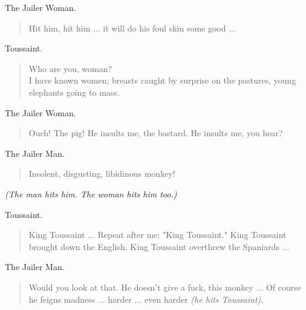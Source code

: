 \documentclass[letterpaper,article,12pt,oneside,notitlepage]{memoir}
\begin{document}
\begin{center}The Jailer Woman.\end{center}

\begin{verse}
Hit him, hit him ... it will do his foul skin some good ... \\
\end{verse}

\begin{center}Toussaint.\end{center}

\begin{verse}
Who are you, woman? \\
I have known women; breasts caught by surprise on the pastures, young elephants going to mass. \\
\end{verse}

\begin{center}The Jailer Woman.\end{center}

\begin{verse}
Ouch! The pig! He insults me, the bastard. He insults me, you hear? \\
\end{verse}

\begin{center}The Jailer Man.\end{center}

\begin{verse}
Insolent, disgusting, libidinous monkey! \\
\end{verse}

\textit{(The man hits him. The woman hits him too.)}

\begin{center}Toussaint.\end{center}

\begin{verse}
\indent King Toussaint ... Repeat after me: "King Toussaint." King Toussaint brought down the English. King Toussaint overthrew the Spaniards ...  \\
\end{verse}

\begin{center}The Jailer Man.\end{center}

\begin{verse}
\indent Would you look at that. He doesn't give a fuck, this monkey ... Of course he feigns madness ... harder ... even harder \textit{(he hits Toussaint)}.  \\
\end{verse}
\end{document}
